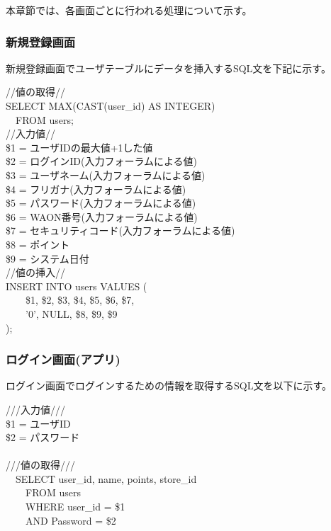 \documentclass[a4j]{jarticle}
\begin{document}
本章節では、各画面ごとに行われる処理について示す。


\subsubsection{新規登録画面}
新規登録画面でユーザテーブルにデータを挿入するSQL文を下記に示す。
\begin{screen}
  //値の取得// \\
  SELECT MAX(CAST(user\_id) AS INTEGER) \\
  　FROM users; \\

  //入力値// \\
  \$1 = ユーザIDの最大値+1した値 \\
  \$2 = ログインID(入力フォーラムによる値) \\
  \$3 = ユーザネーム(入力フォーラムによる値) \\
  \$4 = フリガナ(入力フォーラムによる値) \\
  \$5 = パスワード(入力フォーラムによる値) \\
  \$6 = WAON番号(入力フォーラムによる値) \\
  \$7 = セキュリティコード(入力フォーラムによる値) \\
  \$8 = ポイント \\
  \$9 = システム日付 \\

  //値の挿入//\\
  INSERT INTO users VALUES ( \\
  　　\$1, \$2, \$3, \$4, \$5, \$6, \$7, \\
  　　'0', NULL, \$8, \$9, \$9 \\
  );
\end{screen}


\subsubsection{ログイン画面(アプリ)}
ログイン画面でログインするための情報を取得するSQL文を以下に示す。

\begin{screen}
  ///入力値///\\
  \$1 = ユーザID\\
  \$2 = パスワード\\
  \\
  ///値の取得///\\
  　SELECT user\_id, name, points, store\_id\\
  　　FROM users\\
  　　WHERE user\_id = \$1\\
  　　AND Password = \$2
\end{screen}
\end{document}
